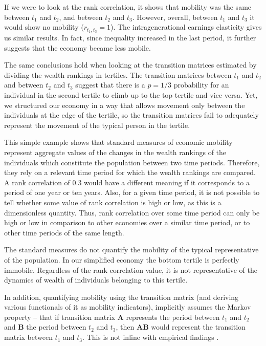 \documentclass[11pt]{article}
\numberwithin{equation}{section}
\begin{document}
If we were to look at the rank correlation, it shows that mobility was the same between $t_1$ and $t_2$, and between $t_2$ and $t_3$. However, overall, between $t_1$ and $t_3$ it would show no mobility ($r_{t_1,t_3} = 1$). The intragenerational earnings elasticity gives us similar results. In fact, since inequality increased in the last period, it further suggests that the economy became less mobile. 

The same conclusions hold when looking at the transition matrices estimated by dividing the wealth rankings in tertiles. The transition matrices between $t_1$ and $t_2$ and between $t_2$ and $t_3$ suggest that there is a $p=1/3$ probability for an individual in the second tertile to climb up to the top tertile and vice versa. Yet, we structured our economy in a way that allows movement only between the individuals at the edge of the tertile, so the transition matrices fail to adequately represent the movement of the typical person in the tertile.

This simple example shows that standard measures of economic mobility represent aggregate values of the changes in the wealth rankings of the individuals which constitute the population between two time periods. Therefore, they rely on a relevant time period for which the wealth rankings are compared. A rank correlation of 0.3 would have a different meaning if it corresponds to a period of one year or ten years. Also, for a given time period, it is not possible to tell whether some value of rank correlation is high or low, as this is a dimensionless quantity. Thus, rank correlation over some time period can only be high or low in comparison to other economies over a similar time period, or to other time periods of the same length.

The standard measures do not quantify the mobility of the typical representative of the population. In our simplified economy the bottom tertile is perfectly immobile. Regardless of the rank correlation value, it is not representative of the dynamics of wealth of individuals belonging to this tertile.

In addition, quantifying mobility using the transition matrix (and deriving various functionals of it as mobility indicators), implicitly assumes the Markov property -- that if transition matrix $\mathbf{A}$ represents the period between $t_1$ and $t_2$ and $\mathbf{B}$ the period between $t_2$ and $t_3$, then $\mathbf{A B}$ would represent the transition matrix between $t_1$ and $t_3$. This is not inline with empirical findings \citep{Mcfarland1970,Clark2015}.
\end{document}
